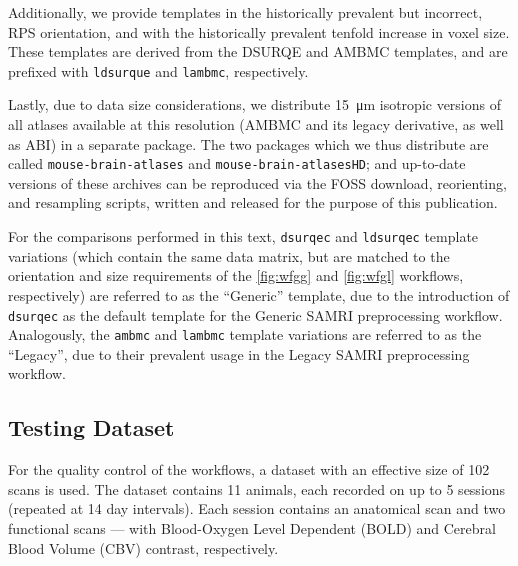 Additionally, we provide templates in the historically prevalent but incorrect, RPS orientation, and with the historically prevalent tenfold increase in voxel size.
These templates are derived from the DSURQE and AMBMC templates, and are prefixed with \textcolor{mg}{\texttt{ldsurque}} and \textcolor{mg}{\texttt{lambmc}}, respectively.

Lastly, due to data size considerations, we distribute \SI{15}{\micro\meter} isotropic versions of all atlases available at this resolution (AMBMC and its legacy derivative, as well as ABI) in a separate package.
The two packages which we thus distribute are called \textcolor{mg}{\texttt{mouse-brain-atlases}} and \textcolor{mg}{\texttt{mouse-brain-atlasesHD}};
and up-to-date versions of these archives can be reproduced via the FOSS download, reorienting, and resampling scripts, written and released for the purpose of this publication.  

For the comparisons performed in this text, \textcolor{mg}{\texttt{dsurqec}} and \textcolor{mg}{\texttt{ldsurqec}} template variations (which contain the same data matrix, but are matched to the orientation and size requirements of the \cref{fig:wfgg} and \cref{fig:wfgl} workflows, respectively) are referred to as the “Generic” template, due to the introduction of \textcolor{mg}{\texttt{dsurqec}} as the default template for the Generic SAMRI preprocessing workflow.
Analogously, the \textcolor{mg}{\texttt{ambmc}} and \textcolor{mg}{\texttt{lambmc}} template variations are referred to as the “Legacy”, due to their prevalent usage in the Legacy SAMRI preprocessing workflow.

\subsection{Testing Dataset}



For the quality control of the workflows, a dataset with an effective size of 102 scans is used.
The dataset contains 11 animals, each recorded on up to 5 sessions (repeated at 14 day intervals).
Each session contains an anatomical scan and two functional scans --- with Blood-Oxygen Level Dependent (BOLD) and Cerebral Blood Volume (CBV) contrast, respectively.

